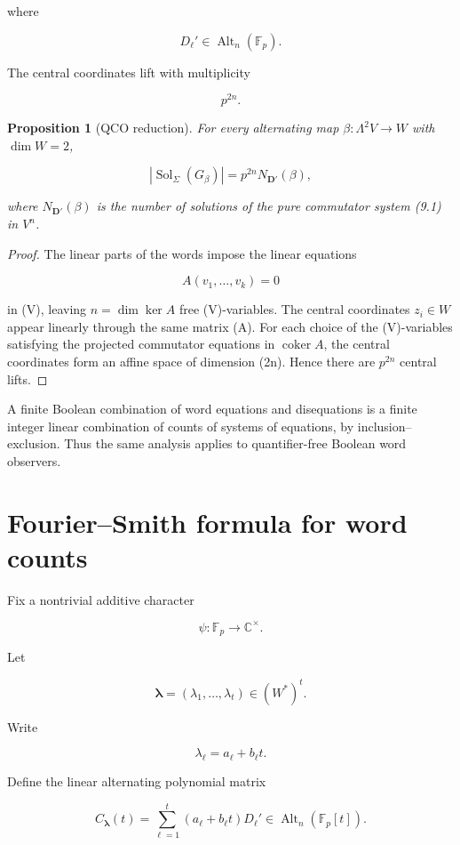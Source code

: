 \documentclass[11pt]{article}
\newtheorem{proposition}[theorem]{Proposition}
\begin{document}
where

\[
D_\ell'\in\operatorname{Alt}_n(\mathbb F_p).
\]

The central coordinates lift with multiplicity

\[
p^{2n}.
\]

\begin{proposition}[QCO reduction]
For every alternating map $\beta: \Lambda^2V\to W$ with $\dim W=2$,

\[
|\operatorname{Sol}_{\Sigma}(G_\beta)|
=p^{2n}N_{\mathbf D'}(\beta),
\tag{9.2}
\]

where $N_{\mathbf D'}(\beta)$ is the number of solutions of the pure commutator system (9.1) in $V^n$.

\end{proposition}

\begin{proof}
The linear parts of the words impose the linear equations

\[
A(v_1,\ldots,v_k)=0
\]

in (V), leaving $n=\dim\ker A$ free (V)-variables. The central coordinates $z_i\in W$ appear linearly through the same matrix (A). For each choice of the (V)-variables satisfying the projected commutator equations in $\operatorname{coker}A$, the central coordinates form an affine space of dimension (2n). Hence there are $p^{2n}$ central lifts.

\end{proof}

A finite Boolean combination of word equations and disequations is a finite integer linear combination of counts of systems of equations, by inclusion--exclusion. Thus the same analysis applies to quantifier-free Boolean word observers.

\section{Fourier--Smith formula for word counts}

Fix a nontrivial additive character

\[
\psi:\mathbb F_p\to\mathbb C^\times.
\]

Let

\[
\boldsymbol\lambda=(\lambda_1,\ldots,\lambda_t)\in (W^*)^t.
\]

Write

\[
\lambda_\ell=a_\ell+b_\ell t.
\]

Define the linear alternating polynomial matrix

\[
C_{\boldsymbol\lambda}(t)
=\sum_{\ell=1}^t
(a_\ell+b_\ell t)D_\ell'
\in
\operatorname{Alt}_n(\mathbb F_p[t]).
\tag{10.1}
\]
\end{document}
